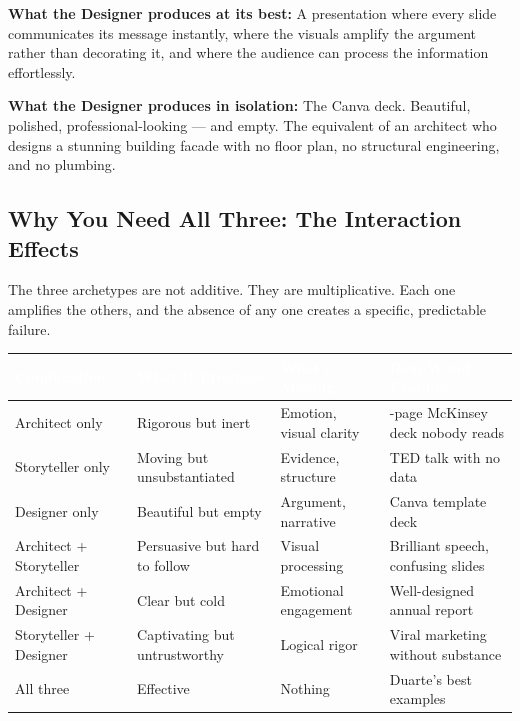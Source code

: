 \textbf{What the Designer produces at its best:} A presentation where every slide communicates its message instantly, where the visuals amplify the argument rather than decorating it, and where the audience can process the information effortlessly.

\textbf{What the Designer produces in isolation:} The Canva deck. Beautiful, polished, professional-looking --- and empty. The equivalent of an architect who designs a stunning building facade with no floor plan, no structural engineering, and no plumbing.

\subsection{Why You Need All Three: The Interaction Effects}

The three archetypes are not additive. They are multiplicative. Each one amplifies the others, and the absence of any one creates a specific, predictable failure.

\begin{center}
\begin{tabularx}{\textwidth}{>{\raggedright}p{3cm} >{\raggedright}p{3cm} >{\raggedright}p{3.5cm} >{\raggedright\arraybackslash}p{4cm}}
\toprule
\rowcolor{tableheader} \textcolor{white}{\textbf{Combination}} & \textcolor{white}{\textbf{What It Produces}} & \textcolor{white}{\textbf{What's Missing}} & \textcolor{white}{\textbf{Real-World Example}} \\
\midrule
Architect only & Rigorous but inert & Emotion, visual clarity & 90-page McKinsey deck nobody reads \\
\rowcolor{altrow}
Storyteller only & Moving but unsubstantiated & Evidence, structure & TED talk with no data \\
Designer only & Beautiful but empty & Argument, narrative & Canva template deck \\
\rowcolor{altrow}
Architect + Storyteller & Persuasive but hard to follow & Visual processing & Brilliant speech, confusing slides \\
Architect + Designer & Clear but cold & Emotional engagement & Well-designed annual report \\
\rowcolor{altrow}
Storyteller + Designer & Captivating but untrustworthy & Logical rigor & Viral marketing without substance \\
All three & Effective & Nothing & Duarte's best examples \\
\bottomrule
\end{tabularx}
\end{center}


